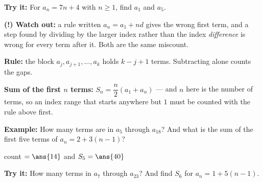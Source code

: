 \documentclass[12pt]{article}
\begin{document}
\begin{tryitbox}
\textbf{Try it:} \quad For $a_n = 7n + 4$ with $n \ge 1$, find $a_1$ and $a_5$.\\[2pt]
\end{tryitbox}

\begin{watchoutbox}
\textbf{(!) Watch out:} a rule written $a_n = a_1 + nd$ gives the wrong first term, and a step found by dividing by the larger index rather than the index \emph{difference} is wrong for every term after it. Both are the same miscount.
\end{watchoutbox}


\begin{formulabox}
\textbf{Rule:} the block $a_j, a_{j+1}, \ldots, a_k$ holds $k - j + 1$ terms. Subtracting alone counts the gaps.\par
\textbf{Sum of the first $n$ terms:} $S_n = \dfrac{n}{2}(a_1 + a_n)$ --- and $n$ here is the number of terms, so an index range that starts anywhere but $1$ must be counted with the rule above first.
\end{formulabox}

\begin{examplebox}
\textbf{Example:} \quad How many terms are in $a_5$ through $a_{18}$? And what is the sum of the first five terms of $a_n = 2 + 3(n-1)$?

count $= \ans{14}$ \quad and \quad $S_5 = \ans{40}$
\end{examplebox}

\begin{tryitbox}
\textbf{Try it:} \quad How many terms in $a_7$ through $a_{23}$? And find $S_6$ for $a_n = 1 + 5(n-1)$.\\[2pt]
\end{tryitbox}
\end{document}
